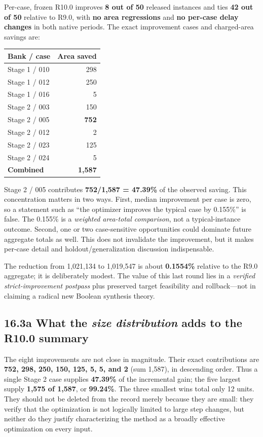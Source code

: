 \documentclass[a4paper,10pt]{article}
\theoremstyle{definition}
\theoremstyle{remark}
\begin{document}
Per-case, frozen R10.0 improves \textbf{8 out of 50} released instances and ties \textbf{42 out of 50} relative to R9.0, with \textbf{no area regressions} and \textbf{no per-case delay changes} in both native periods. The exact improvement cases and charged-area savings are:

\begin{longtable}[]{@{}lr@{}}
\toprule\noalign{}
Bank / case & Area saved \\
\midrule\noalign{}
\endhead
\bottomrule\noalign{}
\endlastfoot
Stage 1 / 010 & 298 \\
Stage 1 / 012 & 250 \\
Stage 1 / 016 & 5 \\
Stage 2 / 003 & 150 \\
Stage 2 / 005 & \textbf{752} \\
Stage 2 / 012 & 2 \\
Stage 2 / 023 & 125 \\
Stage 2 / 024 & 5 \\
\textbf{Combined} & \textbf{1,587} \\
\end{longtable}

Stage 2 / 005 contributes \textbf{752/1,587 = 47.39\%} of the observed saving. This concentration matters in two ways. First, median improvement per case is zero, so a statement such as ``the optimizer improves the typical case by 0.155\%'' is false. The 0.155\% is a \emph{weighted area-total comparison}, not a typical-instance outcome. Second, one or two case-sensitive opportunities could dominate future aggregate totals as well. This does not invalidate the improvement, but it makes per-case detail and holdout/generalization discussion indispensable.

The reduction from 1,021,134 to 1,019,547 is about \textbf{0.1554\%} relative to the R9.0 aggregate; it is deliberately modest. The value of this last round lies in a \emph{verified strict-improvement postpass} plus preserved target feasibility and rollback---not in claiming a radical new Boolean synthesis theory.

\subsection{\texorpdfstring{16.3a What the \emph{size distribution} adds to the R10.0 summary}{16.3a What the size distribution adds to the R10.0 summary}}\label{a-what-the-size-distribution-adds-to-the-r10.0-summary}

The eight improvements are not close in magnitude. Their exact contributions are \textbf{752, 298, 250, 150, 125, 5, 5, and 2} (sum 1,587), in descending order. Thus a single Stage 2 case supplies \textbf{47.39\%} of the incremental gain; the five largest supply \textbf{1,575 of 1,587}, or \textbf{99.24\%}. The three smallest wins total only 12 units. They should not be deleted from the record merely because they are small: they verify that the optimization is not logically limited to large step changes, but neither do they justify characterizing the method as a broadly effective optimization on every input.
\end{document}

